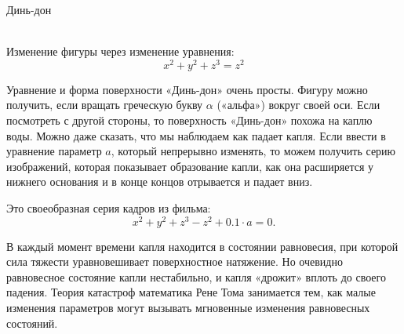\documentclass[ru]{./../../common/SurferDesc}%
\begin{document}
\footnotesize

\begin{surferPage}
  \begin{surferTitle}Динь-дон\end{surferTitle}  \\
Изменение фигуры через изменение уравнения:\\

\smallskip
\[x^2	+ y^2	+ z^3	= z^2\]

\singlespacing
Уравнение и форма поверхности «Динь-дон» очень просты. Фигуру можно получить, если вращать греческую букву $\alpha$ («альфа») вокруг своей оси. Если посмотреть с другой стороны, то поверхность «Динь-дон» похожа на каплю воды. Можно даже сказать, что мы наблюдаем как падает капля.
\newline
Если ввести в уравнение параметр $a$, который непрерывно изменять, то можем получить серию изображений, которая показывает образование капли, как она расширяется у нижнего основания и в конце концов отрывается и падает вниз. 

Это своеобразная серия кадров из фильма:
\smallskip\smallskip\smallskip\smallskip
\[x^2	+ y^2	+ z^3	-z^2+0.1\cdot a=0.\]

В каждый момент времени капля находится в состоянии равновесия, при которой сила тяжести уравновешивает поверхностное натяжение. Но очевидно равновесное состояние капли нестабильно, и капля «дрожит» вплоть до своего падения. Теория катастроф математика Рене Тома занимается тем, как малые изменения параметров могут вызывать мгновенные изменения равновесных состояний.



  \begin{surferText}
     \end{surferText}
\end{surferPage}


\end{document}
